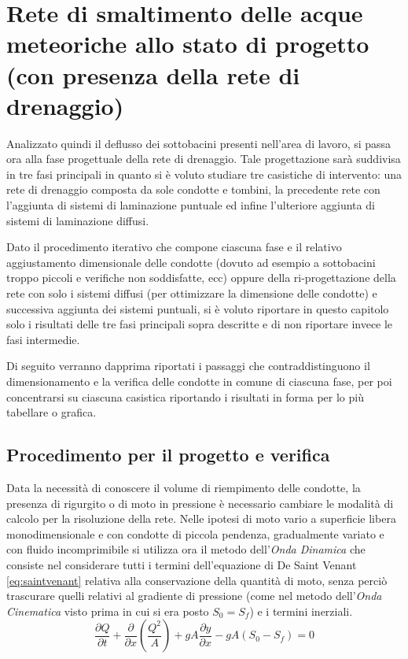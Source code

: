 \chapter{Rete di smaltimento delle acque meteoriche allo stato di progetto (con presenza
della rete di drenaggio)} \label{cap:ProgettoRete}
Analizzato quindi il deflusso dei sottobacini presenti nell'area di lavoro, si passa ora alla fase progettuale della rete di drenaggio. 
Tale progettazione sarà suddivisa in tre fasi principali in quanto si è voluto studiare tre casistiche di intervento: una rete di drenaggio composta da sole condotte e tombini, la precedente rete con l'aggiunta di sistemi di laminazione puntuale ed infine l'ulteriore aggiunta di sistemi di laminazione diffusi.

Dato il procedimento iterativo che compone ciascuna fase e il relativo aggiustamento dimensionale delle condotte (dovuto ad esempio  a sottobacini troppo piccoli e verifiche non soddisfatte, ecc) oppure della ri-progettazione della rete con solo i sistemi diffusi (per ottimizzare la dimensione delle condotte) e successiva aggiunta dei sistemi puntuali, si è voluto riportare in questo capitolo solo i risultati delle tre fasi principali sopra descritte e di  non riportare invece le fasi intermedie. %

Di seguito verranno dapprima riportati i passaggi che contraddistinguono il dimensionamento e la verifica delle condotte in comune di ciascuna fase, per poi concentrarsi su ciascuna casistica riportando i risultati in forma per lo più tabellare o grafica.

\section{Procedimento per il progetto e verifica}
Data la necessità di conoscere il volume di riempimento delle condotte, la presenza di rigurgito o di moto in pressione è necessario cambiare le modalità di calcolo per la risoluzione della rete.
Nelle ipotesi di moto vario a superficie libera monodimensionale e con condotte di piccola pendenza, gradualmente variato e con fluido incomprimibile si utilizza ora il metodo dell'\emph{Onda Dinamica} che consiste nel considerare tutti i termini dell'equazione di De Saint Venant \ref{eq:saintvenant} relativa alla conservazione della quantità di moto, senza perciò trascurare quelli relativi al gradiente di pressione (come nel metodo dell'\emph{Onda Cinematica} visto prima in cui si era posto $S_0 = S_f$) e i termini inerziali. 
\begin{equation}
    \label{eq:saintvenant}
    \frac{\partial Q}{\partial t} + \frac{\partial}{\partial x} \left( \frac{Q^2}{A} \right) + g A \frac{\partial y}{\partial x} - g A (S_0 - S_f) = 0
 \end{equation}

